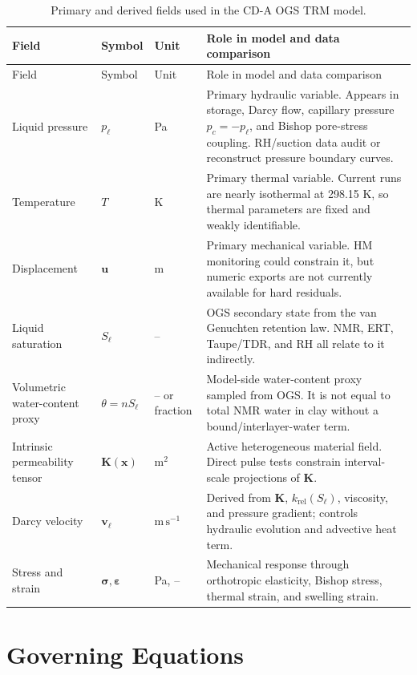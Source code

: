 \documentclass[10pt,a4paper]{article}
\newcommand{\uu}{\bm{u}}
\newcommand{\sig}{\bm{\sigma}}
\newcommand{\TT}{T}
\newcommand{\pp}{p_\ell}
\newcommand{\npor}{n}
\newcommand{\Sat}{S_\ell}
\newcommand{\vW}{\bm v_\ell}
\newcommand{\K}{\bm K}
\newcommand{\krel}{k_{\mathrm{rel}}}
\newcommand{\thetaw}{\theta}
\begin{document}
\begin{longtable}{@{}L{0.18\textwidth}L{0.18\textwidth}L{0.16\textwidth}Y@{}}
\caption{Primary and derived fields used in the CD-A OGS TRM model.}\\
\toprule
Field & Symbol & Unit & Role in model and data comparison \\
\midrule
\endfirsthead
\toprule
Field & Symbol & Unit & Role in model and data comparison \\
\midrule
\endhead
\bottomrule
\endlastfoot
Liquid pressure & \(\pp\) & Pa & Primary hydraulic variable.  Appears in storage, Darcy flow, capillary pressure \(p_c=-p_\ell\), and Bishop pore-stress coupling.  RH/suction data audit or reconstruct pressure boundary curves. \\
Temperature & \(\TT\) & K & Primary thermal variable.  Current runs are nearly isothermal at 298.15 K, so thermal parameters are fixed and weakly identifiable. \\
Displacement & \(\uu\) & m & Primary mechanical variable.  HM monitoring could constrain it, but numeric exports are not currently available for hard residuals. \\
Liquid saturation & \(\Sat\) & -- & OGS secondary state from the van Genuchten retention law.  NMR, ERT, Taupe/TDR, and RH all relate to it indirectly. \\
Volumetric water-content proxy & \(\thetaw=\npor\Sat\) & -- or fraction & Model-side water-content proxy sampled from OGS.  It is not equal to total NMR water in clay without a bound/interlayer-water term. \\
Intrinsic permeability tensor & \(\K(\bm x)\) & \(\mathrm{m^2}\) & Active heterogeneous material field.  Direct pulse tests constrain interval-scale projections of \(\K\). \\
Darcy velocity & \(\vW\) & \(\mathrm{m\,s^{-1}}\) & Derived from \(\K\), \(\krel(\Sat)\), viscosity, and pressure gradient; controls hydraulic evolution and advective heat term. \\
Stress and strain & \(\sig,\bm\varepsilon\) & Pa, -- & Mechanical response through orthotropic elasticity, Bishop stress, thermal strain, and swelling strain. \\
\end{longtable}

\section{Governing Equations}
\end{document}
